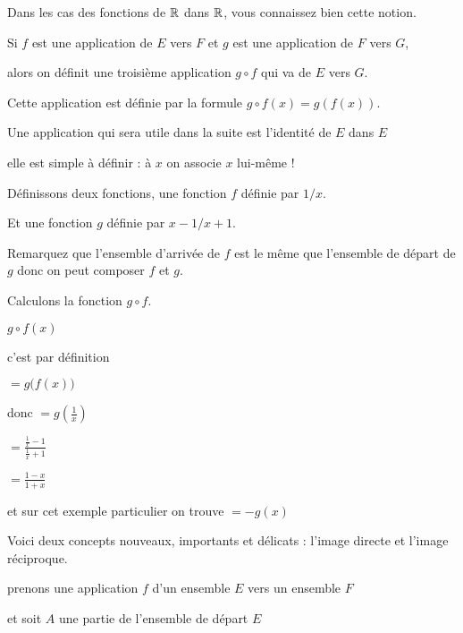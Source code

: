 \change

Dans les cas des fonctions de $\mathbb{R}$ dans $\mathbb{R}$, vous connaissez bien
cette notion.

\change

Si $f$ est une application de $E$ vers $F$ et $g$ est une application
de $F$ vers $G$, 

\change

alors on définit une troisième application $g\circ f$ qui va de $E$ vers $G$.

Cette application est définie  par la formule  
$g\circ f(x) = g(f(x))$.


\diapo

Une application qui sera utile dans la suite est l'identité de $E$ dans $E$

elle est simple à définir : à $x$ on associe $x$ lui-même !

\change

Définissons deux fonctions, une fonction $f$ définie par $1/x$.

Et une fonction $g$ définie par $x-1/x+1$.

\change

Remarquez que l'ensemble d'arrivée de $f$ 
est le même que l'ensemble de départ de $g$
donc on peut composer $f$ et $g$.

Calculons la fonction $g\circ f$.

$g\circ f(x)$
 
\change

c'est par définition 

$= g \big(f(x)\big) $

\change

donc 
$= g \left(\frac 1x \right) $

\change

$= \frac{\frac 1x - 1}{\frac 1x + 1} $

\change

$= \frac{1-x}{1+x}$ 

\change

et sur cet exemple particulier on trouve 
$= - g(x)$

\diapo

Voici deux concepts nouveaux, importants et délicats : l'image directe et l'image réciproque.

prenons une application $f$ d'un ensemble $E$ vers un ensemble $F$

et soit $A$ une partie de l'ensemble de départ $E$ 



